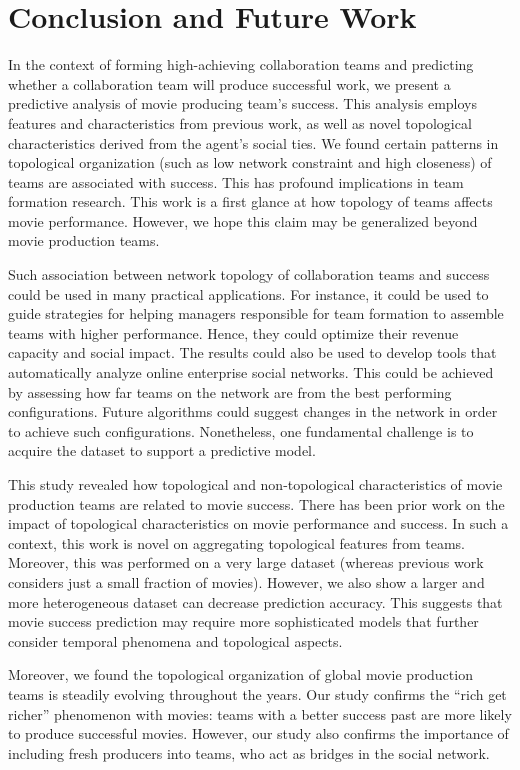 \chapter{Conclusion and Future Work}
\label{chapter:conclusion}
In the context of forming high-achieving collaboration teams and predicting
whether a collaboration team will produce successful work, we present a
predictive analysis of movie producing team's success. This analysis employs
features and characteristics from previous work, as well as novel topological
characteristics derived from the agent's social ties. We found certain patterns
in topological organization (such as low network constraint and high closeness)
of teams are associated with success. This has profound implications in team
formation research. This work is a first glance at how topology of teams
affects movie performance. However, we hope this claim may be generalized
beyond movie production teams.

Such association between network topology of collaboration teams and success
could be used in many practical applications. For instance, it could be used to
guide strategies for helping managers responsible for team formation to
assemble teams with higher performance. Hence, they could optimize their
revenue capacity and social impact. The results could also be used to develop
tools that automatically analyze online enterprise social networks. This could
be achieved by assessing how far teams on the network are from the best
performing configurations. Future algorithms could suggest changes in the
network in order to achieve such configurations. Nonetheless, one fundamental
challenge is to acquire the dataset to support a predictive model.

This study revealed how topological and non-topological characteristics of
movie production teams are related to movie success. There has been prior work
on the impact of topological characteristics on movie performance and success.
In such a context, this work is novel on aggregating topological features from
teams. Moreover, this was performed on a very large dataset (whereas previous
work considers just a small fraction of movies). However, we also show a larger
and more heterogeneous dataset can decrease prediction accuracy. This suggests
that movie success prediction may require more sophisticated models that
further consider temporal phenomena and topological aspects.

Moreover, we found the topological organization of global movie production
teams is steadily evolving throughout the years. Our study confirms the ``rich
get richer'' phenomenon with movies: teams with a better success past are more
likely to produce successful movies. However, our study also confirms the
importance of including fresh producers into teams, who act as bridges in the
social network. 

